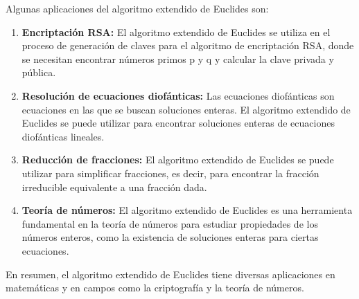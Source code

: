 Algunas aplicaciones del algoritmo extendido de Euclides son:

\begin{enumerate}
	\item \textbf{Encriptación RSA:} El algoritmo extendido de Euclides se utiliza en el proceso de generación de claves para el algoritmo de encriptación RSA, donde se necesitan encontrar números primos p y q y calcular la clave privada y pública.
	\item \textbf{Resolución de ecuaciones diofánticas:} Las ecuaciones diofánticas son ecuaciones en las que se buscan soluciones enteras. El algoritmo extendido de Euclides se puede utilizar para encontrar soluciones enteras de ecuaciones diofánticas lineales. 
	\item \textbf{Reducción de fracciones:} El algoritmo extendido de Euclides se puede utilizar para simplificar fracciones, es decir, para encontrar la fracción irreducible equivalente a una fracción dada.
	\item \textbf{Teoría de números:} El algoritmo extendido de Euclides es una herramienta fundamental en la teoría de números para estudiar propiedades de los números enteros, como la existencia de soluciones enteras para ciertas ecuaciones.
\end{enumerate}

En resumen, el algoritmo extendido de Euclides tiene diversas aplicaciones en matemáticas y en campos como la criptografía y la teoría de números.